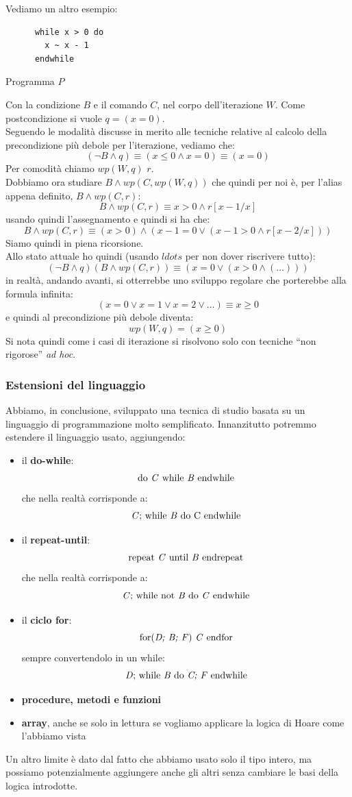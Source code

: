 \documentclass[a4paper,12pt, oneside]{book}
\begin{document}
\begin{esempio}
   Vediamo un altro esempio:
  \begin{listing}[H]
    \begin{lstlisting}
      while x > 0 do
        x ~ x - 1
      endwhile
    \end{lstlisting}
    \caption{Programma $P$}
  \end{listing}
  Con la condizione $B$ e il comando $C$, nel corpo dell'iterazione $W$. Come
  postcondizione si vuole $q=(x=0)$.\\
  Seguendo le modalità discusse in merito alle tecniche relative al calcolo
  della precondizione più debole per l'iterazione, vediamo che:
  \[(\neg B\land q)\equiv (x\leq 0\land x=0)\equiv (x=0)\]
  Per comodità chiamo $wp(W,q)$ $r$.\\ 
  Dobbiamo ora studiare $B\land wp(C,wp(W,q))$ che quindi per noi è, per l'alias
  appena definito, $B\land wp(C,r)$:
  \[B\land wp(C,r)\equiv x>0\land r[x-1/x]\]
  usando quindi l'assegnamento e quindi si ha che:
  \[B\land wp(C,r)\equiv (x>0)\land (x-1=0\lor (x-1>0\land r[x-2/x]))\]
  Siamo quindi in piena ricorsione.\\
  Allo stato attuale ho quindi (usando $ldots$ per non dover riscrivere tutto):
  \[(\neg B\land q)(B\land wp(C,r))\equiv (x=0 \lor(x>0\land(\ldots)))\]
  in realtà, andando avanti, si otterrebbe uno sviluppo regolare che porterebbe
  alla formula infinita:
  \[(x=0\lor x=1\lor x=2\lor \ldots)\equiv x\geq 0\]
  e quindi al precondizione più debole diventa:
  \[wp(W,q)=(x\geq 0)\]
  Si nota quindi come i casi di iterazione si risolvono solo con tecniche ``non
  rigorose'' \textit{ad hoc}.
\end{esempio}
\subsubsection{Estensioni del linguaggio}
Abbiamo, in conclusione, sviluppato una tecnica di studio basata su un
linguaggio di programmazione molto semplificato. Innanzitutto potremmo estendere
il linguaggio usato, aggiungendo:
\begin{itemize}
  \item il \textbf{do-while}:
  \[\mbox{do \textit{C} while \textit{B} endwhile}\]
  che nella realtà corrisponde a:
  \[\mbox{\textit{C}; while \textit{B} do
      \textnormal{C} endwhile}\]
  \item il \textbf{repeat-until}:
  \[\mbox{repeat \textit{C} until \textit{B} endrepeat}\]
  che nella realtà corrisponde a:
  \[\mbox{\textit{C}; while not \textit{B} do
      \textit{C} endwhile}\]
  \item il \textbf{ciclo for}:
  \[\mbox{for(\textit{D; B; F}) \textit{C} endfor} \]
  sempre convertendolo in un while:
   \[\mbox{\textit{D}; while \textit{B} do
      \textit{C; F}  endwhile}\]
  \item \textbf{procedure, metodi e funzioni}
  \item \textbf{array}, anche se solo in lettura se vogliamo applicare la logica
  di Hoare come l'abbiamo vista
\end{itemize}
Un altro limite è dato dal fatto che abbiamo usato solo il tipo intero, ma
possiamo potenzialmente aggiungere anche gli altri senza cambiare le basi della
logica introdotte.
\end{document}

